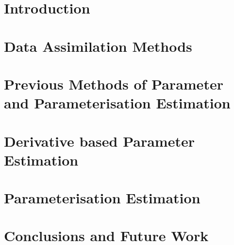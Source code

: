\documentclass[a4paper,oneside,titlepage,11pt]{report}
\theoremstyle{plain}
\begin{document}
{}
\thispagestyle{plain}


\printnomenclature[2cm]
\thispagestyle{plain}
\clearpage





\chapter{Introduction}		%
\label{ch01}			%
\thispagestyle{headings}	%

\chapter{Data Assimilation Methods}
\label{ch02}
\thispagestyle{headings}


\chapter{Previous Methods of Parameter and Parameterisation Estimation}
\label{ch03}
\thispagestyle{headings}


\chapter{Derivative based Parameter Estimation}
\label{ch04}
\thispagestyle{headings}


\chapter{Parameterisation Estimation}
\label{ch05}
\thispagestyle{headings}


\chapter{Conclusions and Future Work}
\label{ch06}
\thispagestyle{headings}


%
%
%
%
%
%
%
%
%
%
%
%
%
%
%
\end{document}
